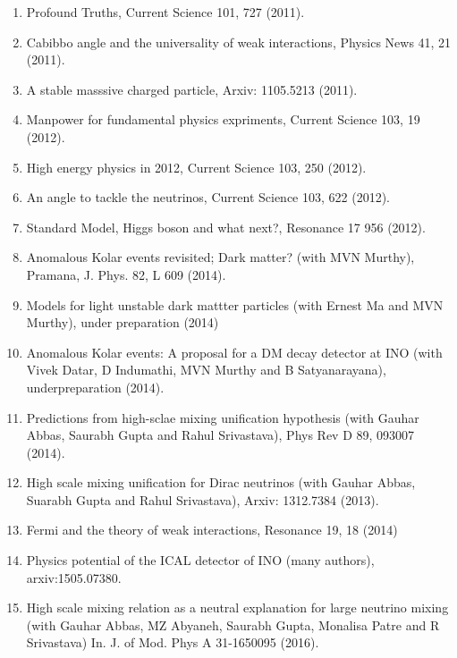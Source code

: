 \begin{enumerate}
\item Profound Truths, Current Science 101, 727 (2011).

\item Cabibbo angle and the universality of weak interactions, Physics News 41, 21 (2011).

\item A stable masssive charged particle, Arxiv: 1105.5213 (2011).

\item Manpower for fundamental physics expriments, Current Science 103, 19 (2012).

\item High energy physics in 2012, Current Science 103, 250 (2012).

\item An angle to tackle the neutrinos, Current Science 103, 622 (2012).

\item Standard Model, Higgs boson and what next?, Resonance 17 956 (2012).

\item Anomalous Kolar events revisited; Dark matter? (with MVN Murthy), Pramana, J. Phys. 82, L 609 (2014).

\item Models for light unstable dark mattter particles (with Ernest Ma and MVN Murthy), under preparation (2014)

\item Anomalous Kolar events: A proposal for a DM decay detector at INO (with Vivek Datar, D Indumathi, MVN Murthy and B Satyanarayana), underpreparation (2014).

\item Predictions from high-sclae mixing unification hypothesis (with Gauhar Abbas, Saurabh Gupta and Rahul Srivastava), Phys Rev D 89, 093007 (2014).

\item High scale mixing unification for Dirac neutrinos (with Gauhar Abbas, Suarabh Gupta and Rahul Srivastava), Arxiv: 1312.7384 (2013).

\item Fermi and the theory of weak interactions, Resonance 19, 18 (2014)

\item Physics potential of the ICAL detector of INO (many authors), arxiv:1505.07380.

\item High scale mixing relation as a neutral explanation for large neutrino mixing (with Gauhar Abbas, MZ Abyaneh, Saurabh Gupta, Monalisa Patre and R Srivastava) In. J. of Mod. Phys A 31-1650095 (2016).


\end{enumerate}
